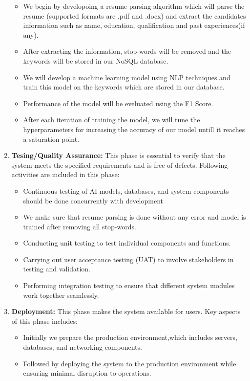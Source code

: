 \begin{enumerate}
\begin{itemize}
			\item We begin by developoing a resume parsing algorithm which will parse the resume (supported formats are .pdf and .docx) and extract the candidates information such as name, education, qualification and past experiences(if any).
			\item After extracting the information, stop-words will be removed and the keywords will be stored in our NoSQL database. 
			\item We will develop a machine learning model using NLP techniques and train this model on the keywords which are stored in our database.
			\item Performance of the model will be eveluated using the F1 Score.
			\item After each iteration of training the model, we will tune the hyperparameters for increasing the accuracy of our model untill it reaches a saturation point.
		\end{itemize}
	\item \textbf{Tesing/Quality Assurance:} This phase is essential to verify that the system meets the specified requirements and is free of defects. Following activities are included in this phase:
		\begin{itemize}
			\item Continuous testing of AI models, databases, and system components should be done concurrently with development
			\item We make sure that resume parsing is done without any error and model is trained after removing all stop-words.
			\item Conducting unit testing to test individual components and functions.
			\item Carrying out user acceptance testing (UAT) to involve stakeholders in testing and validation.
			\item Performing integration testing to ensure that different system modules work together seamlessly.
		\end{itemize}
	\item \textbf{Deployment:} This phase makes the system available for users. Key aspects of this phase includes:
		\begin{itemize}
			\item Initially we prepare the production environment,which includes servers, databases, and networking components.
			\item Followed by deploying the system to the production environment while ensuring minimal disruption to operations.

\end{itemize}
\end{enumerate}
